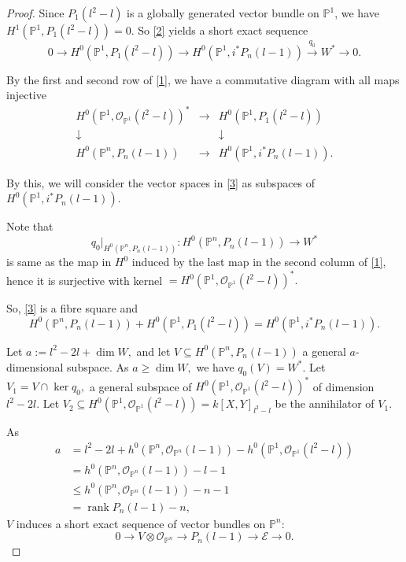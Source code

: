 \documentclass[11pt,letterpaper]{amsart}
\begin{document}
\begin{proof}
Since $P_1(l^2-l)$ is a globally generated vector bundle on
$\mathbb{P}^1$, we have $H^1(\mathbb{P}^1,P_1(l^2-l))=0.$
So \eqref{2} yields a short exact sequence
\[
0
\to
H^0(\mathbb{P}^1,P_1(l^2-l))
\to
H^0(\mathbb{P}^1,i^*P_n(l-1))
\xrightarrow{q_0}
W^*
\to 0.
\]

By the first and second row of \eqref{1}, we have a commutative diagram with all maps injective
\begin{equation}\label{3}
\begin{array}{ccc}
H^0(\mathbb{P}^1,\mathcal{O}_{\mathbb{P}^1}(l^2-l))^*
&\rightarrow&
H^0(\mathbb{P}^1,P_1(l^2-l))
\\
\downarrow && \downarrow
\\
H^0(\mathbb{P}^n,P_n(l-1))
&\longrightarrow&
H^0(\mathbb{P}^1,i^*P_n(l-1)).
\end{array}
\end{equation}

By this, we will consider the vector spaces in \eqref{3} as subspaces of $H^0(\mathbb{P}^1, i^*P_n(l-1)).$

Note that
\[
q_0\big|_{H^0(\mathbb{P}^n,P_n(l-1))}
:
H^0(\mathbb{P}^n,P_n(l-1))
\to
W^*
\]
is same as the map in $H^0$ induced by the last map in the second column of \eqref{1}, hence it is surjective with kernel $=H^0(\mathbb{P}^1,\mathcal{O}_{\mathbb{P}^1}(l^2-l))^*.$

So, \eqref{3} is a fibre square and 
\[
H^0(\mathbb{P}^n,P_n(l-1))
+
H^0(\mathbb{P}^1,P_1(l^2-l))
=
H^0(\mathbb{P}^1,i^*P_n(l-1)).
\]

Let $a:=l^2-2l+\dim W,$
and let $V\subseteq H^0(\mathbb{P}^n,P_n(l-1))$ a general $a$-dimensional subspace. As $a\ge \dim W,$
we have $q_0(V)=W^*.$ Let $V_1
=V\cap
\ker q_0,$
a general subspace of $H^0(\mathbb{P}^1,\mathcal{O}_{\mathbb{P}^1}(l^2-l))^*$
of dimension $l^2-2l.$ Let $V_2
\subseteq
H^0(\mathbb{P}^1,\mathcal{O}_{\mathbb{P}^1}(l^2-l))
=
k[X,Y]_{l^2-l}
$
be the annihilator of $V_1$.

As
\begin{align*}
a
&=
l^2-2l
+
h^0(\mathbb{P}^n,\mathcal{O}_{\mathbb{P}^n}(l-1))
-
h^0(\mathbb{P}^1,\mathcal{O}_{\mathbb{P}^1}(l^2-l))\\
&=
h^0(\mathbb{P}^n,\mathcal{O}_{\mathbb{P}^n}(l-1))
-l-1\\
&\le
h^0(\mathbb{P}^n,\mathcal{O}_{\mathbb{P}^n}(l-1))
-n-1\\
&=
\operatorname{rank}P_n(l-1)-n,
\end{align*}
$V$ induces a short exact sequence of vector bundles on
$\mathbb{P}^n$:
\begin{equation}\label{11}
0
\to
V\otimes\mathcal{O}_{\mathbb{P}^n}
\to
P_n(l-1)
\to
\mathcal{E}
\to
0.
\end{equation}


\end{proof}
\end{document}
